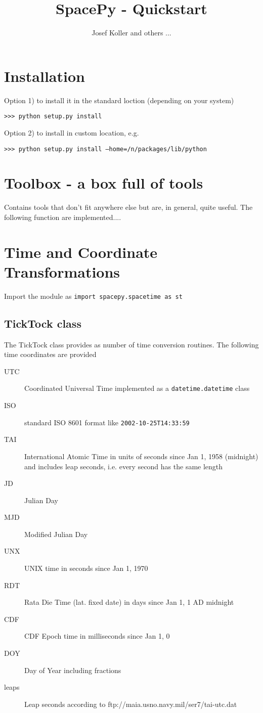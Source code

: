 \documentclass[11pt]{amsart}
\title{SpacePy - Quickstart}
\author{Josef Koller and others ...}
\date{}                                           %
\begin{document}
\maketitle

\section{Installation}

Option 1) to install it in the standard loction (depending on your system)

\texttt{>>> python setup.py install}

Option 2) to install in custom location, e.g.

\texttt{>>> python setup.py install --home=/n/packages/lib/python}

\section{Toolbox - a box full of tools}

Contains tools that don't fit anywhere else but are, in general, quite useful. The following function are implemented....

\section{Time and Coordinate Transformations}

Import the module as \texttt{import spacepy.spacetime as st}

\subsection{TickTock class}

The TickTock class provides as number of time conversion routines. The following time coordinates are provided

\begin{description}
\item[UTC] Coordinated Universal Time implemented as a \texttt{datetime.datetime} class
\item[ISO] standard ISO 8601 format like \texttt{2002-10-25T14:33:59}
\item[TAI] International Atomic Time in units of seconds since Jan 1, 1958 (midnight) and includes leap seconds, i.e. every second has the same length
\item[JD] Julian Day
\item[MJD] Modified Julian Day
\item[UNX] UNIX time in seconds since Jan 1, 1970
\item[RDT] Rata Die Time (lat. fixed date) in days since Jan 1, 1 AD midnight
\item[CDF] CDF Epoch time in milliseconds since Jan 1, 0 
\item[DOY] Day of Year including fractions
\item[leaps] Leap seconds according to ftp://maia.usno.navy.mil/ser7/tai-utc.dat 
\end{description}
\end{document}

